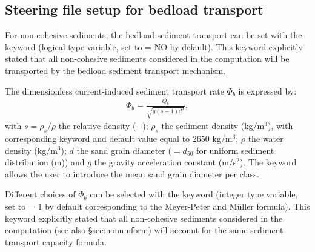 
\subsection{Steering file setup for bedload transport}
For non-cohesive sediments, the bedload sediment transport can be set with the keyword  (logical type variable, set to {\ttfamily = NO} by default). This keyword explicitly stated that all non-cohesive sediments considered in the computation will be transported by the bedload sediment transport mechanism.

The dimensionless current-induced sediment transport rate $\Phi_b$ is expressed by:
\begin{align}
\Phi_b = \frac{Q_b}{\sqrt{g(s-1)d^3}},
\label{eq:Phis}
\end{align}
with $s=\rho_s/\rho$ the relative density ($-$); $\rho_s$ the sediment density (kg$/$m$^3$), with corresponding keyword  and default value equal to $2650$ kg/m$^3$; $\rho$ the water density (kg$/$m$^3$); $d$ the sand grain diameter ($=d_{50}$ for uniform sediment distribution (m)) and $g$ the gravity acceleration constant (m$/$s$^2$). The keyword  allows the user to introduce the mean sand grain diameter per class.

Different choices of $\Phi_b$ can be selected with the keyword  (integer type variable, set to {\ttfamily = 1} by default corresponding to the Meyer-Peter and M\"uller formula). This keyword explicitly stated that all non-cohesive sediments considered in the computation (see also \S{sec:nonuniform}) will account for the same sediment transport capacity formula. %

